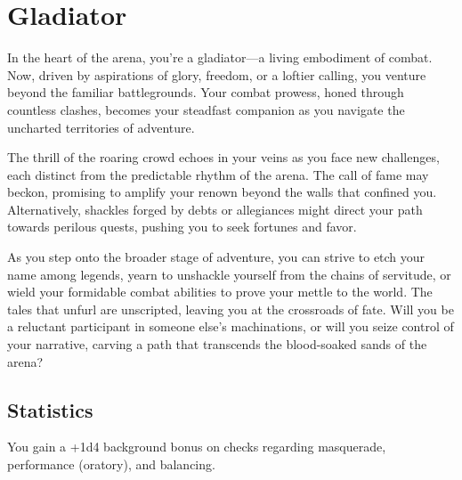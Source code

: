 \section{Gladiator}\label{background:gladiator}
In the heart of the arena, you're a gladiator—a living embodiment of combat.
Now, driven by aspirations of glory, freedom, or a loftier calling, you venture beyond the familiar battlegrounds.
Your combat prowess, honed through countless clashes, becomes your steadfast companion as you navigate the uncharted territories of adventure.

The thrill of the roaring crowd echoes in your veins as you face new challenges, each distinct from the predictable rhythm of the arena.
The call of fame may beckon, promising to amplify your renown beyond the walls that confined you.
Alternatively, shackles forged by debts or allegiances might direct your path towards perilous quests, pushing you to seek fortunes and favor.

As you step onto the broader stage of adventure, you can strive to etch your name among legends, yearn to unshackle yourself from the chains of servitude, or wield your formidable combat abilities to prove your mettle to the world.
The tales that unfurl are unscripted, leaving you at the crossroads of fate.
Will you be a reluctant participant in someone else's machinations, or will you seize control of your narrative, carving a path that transcends the blood-soaked sands of the arena?

\subsection{Statistics}
You gain a +1d4 background bonus on checks regarding masquerade, performance (oratory), and balancing.
